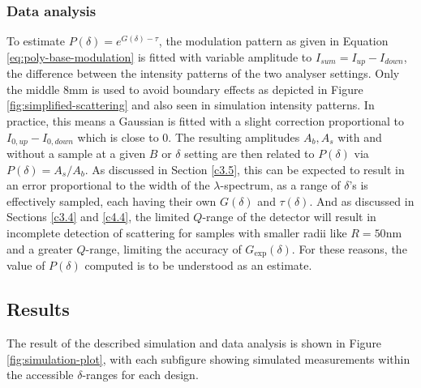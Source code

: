 \documentclass{article}
\begin{document}
\subsubsection{Data analysis}
To estimate $P(\delta) = e^{G(\delta)  - \tau}$, the modulation pattern as given in Equation \eqref{eq:poly-base-modulation} is fitted with variable amplitude to $I_{sum} = I_{up} - I_{down}$, the difference between the intensity patterns of the two analyser settings. Only the middle $8\unit{\milli\meter}$ is used to avoid boundary effects as depicted in Figure \ref{fig:simplified-scattering} and also seen in simulation intensity patterns. In practice, this means a Gaussian is fitted with a slight correction proportional to $I_{0,up} - I_{0,down}$ which is close to $0$. The resulting amplitudes $A_b, A_s$ with and without a sample at a given $B$ or $\delta$ setting are then related to $P(\delta)$ via $P(\delta) = A_s/A_b$. As discussed in Section \ref{c3.5}, this can be expected to result in an error proportional to the width of the $\lambda$-spectrum, as a range of $\delta$'s is effectively sampled, each having their own $G(\delta)$ and $\tau(\delta)$. And as discussed in Sections \ref{c3.4} and \ref{c4.4}, the limited $Q$-range of the detector will result in incomplete detection of scattering for samples with smaller radii like $R = 50 \unit{\nano\meter}$ and a greater $Q$-range, limiting the accuracy of $G_\text{exp}(\delta)$. For these reasons, the value of $P(\delta)$ computed is to be understood as an estimate.  
\subsection{Results}
The result of the described simulation and data analysis is shown in Figure \ref{fig:simulation-plot}, with each subfigure showing simulated measurements within the accessible $\delta$-ranges for each design.
\end{document}
